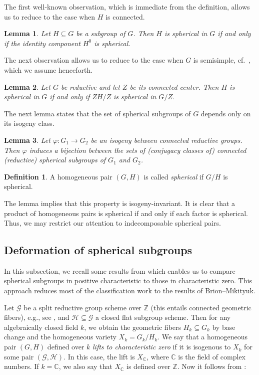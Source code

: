 \documentclass[12pt]{amsart}
\renewcommand{\phi}{\varphi}
\newcommand\CG{{\mathcal G}}
\newcommand\CH{{\mathcal H}}
\newcommand\BBC{{\mathbb C}}
\newcommand\BBZ{{\mathbb Z}}
\numberwithin{equation}{section}
\newtheorem{lemma}[lemma]{Lemma}
\theoremstyle{definition}
\newtheorem{definition}[definition]{Definition}
\begin{document}
The first well-known observation, which is immediate from the
definition, allows us to reduce to the case when $H$ is connected.

\begin{lemma}
  \label{lemma0}
  Let $H\subseteq G$ be a subgroup of $G$.  Then $H$ is spherical in
  $G$ if and only if the identity component $H^0$ is spherical.
\end{lemma}

The next observation allows us to reduce to the case when $G$ is
semisimple, cf.~\cite[\S 4]{Kr}, which we assume henceforth.

\begin{lemma}
  \label{lem:ss}
  Let $G$ be reductive and let $Z$ be its connected center. Then $H$
  is spherical in $G$ if and only if $ZH/Z$ is spherical in $G/Z$.
\end{lemma}

The next lemma states that the set of spherical subgroups of $G$
depends only on its isogeny class.

\begin{lemma}
  \label{lem:isogeny}
  Let $\phi:G_1\to G_2$ be an isogeny between connected reductive
  groups.  Then $\phi$ induces a bijection between the sets of
  (conjugacy classes of) connected (reductive) spherical subgroups of
  $G_1$ and $G_2$.
\end{lemma}

\begin{definition}
	\label{def:sphpair}
	A homogeneous pair $(G,H)$ is called \emph{spherical} if $G/H$ is	spherical. 
\end{definition}

The lemma implies that this property is
isogeny-invariant. It is clear that a product of homogeneous pairs is
spherical if and only if each factor is spherical. Thus, we may
restrict our attention to indecomposable spherical pairs.

\subsection{Deformation of spherical subgroups}
\label{subsec:deformation}
In this subsection, we recall some results from \cite[Thm.\ 3.4]{KR}
which enables us to compare spherical subgroups in positive
characteristic to those in characteristic zero. This approach reduces
most of the classification work to the results of Brion--Mikityuk.

Let $\CG$ be a split reductive group scheme over $\BBZ$ (this entails
connected geometric fibers), e.g., see \cite[Exp.~I,
4.2]{demazurgrothendieck:schemasengroupes}, and $\CH\subseteq\CG$ a
closed flat subgroup scheme. Then for any algebraically closed field
$k$, we obtain the geometric fibers $H_k\subseteq G_k$ by base change
and the homogeneous variety $X_k=G_k/H_k$. We say that a homogeneous pair
$(G,H)$ defined over $k$ \emph{lifts to characteristic zero} if it is
isogenous to $X_k$ for some pair $(\CG,\CH)$. In this case, the lift
is $X_\BBC$, where $\BBC$ is the field of complex numbers. If
$k=\BBC$, we also say that $X_\BBC$ is defined over $\BBZ$.  Now it
follows from \cite[Thm.\ 3.4]{KR}:
\end{document}
